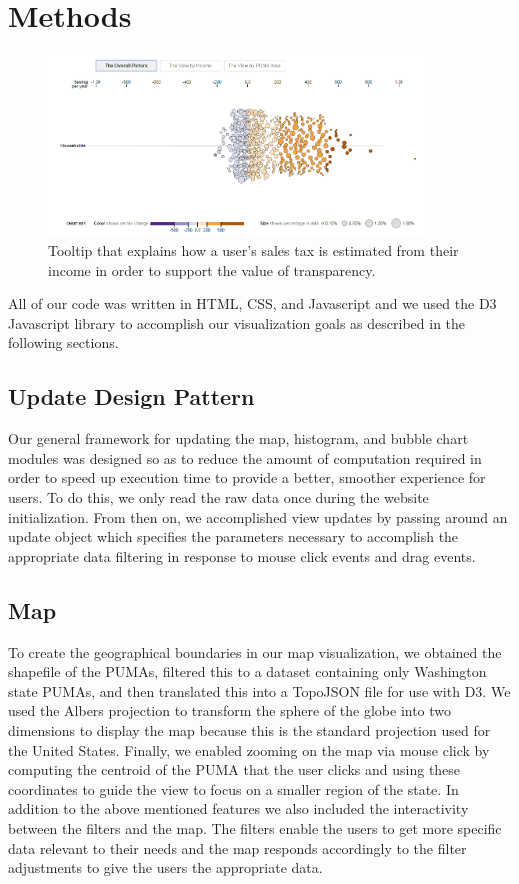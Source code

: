 \documentclass{sigchi}
\begin{document}
\section{Methods}
\begin{figure}[t]
\centering
\includegraphics[width=0.9\textwidth]{bubbleOverall}
\caption{Tooltip that explains how a user's sales tax is estimated from their income in order to support the value of transparency.}
\label{fig:bubbleOverall}
\end{figure}
All of our code was written in HTML, CSS, and Javascript and we used the D3 Javascript library to accomplish our visualization goals as described in the following sections. 

\subsection{Update Design Pattern}
Our general framework for updating the map, histogram, and bubble chart modules was designed so as to reduce the amount of computation required in order to speed up execution time to provide a better, smoother experience for users. To do this, we only read the raw data once during the website initialization. From then on, we accomplished view updates by passing around an update object which specifies the parameters necessary to accomplish the appropriate data filtering in response to mouse click events and drag events. 

\subsection{Map}
To create the geographical boundaries in our map visualization, we obtained the shapefile of the PUMAs, filtered this to a dataset containing only Washington state PUMAs, and then translated this into a TopoJSON file for use with D3. We used the Albers projection to transform the sphere of the globe into two dimensions to display the map because this is the standard projection used for the United States. Finally, we enabled zooming on the map via mouse click by computing the centroid of the PUMA that the user clicks and using these coordinates to guide the view to focus on a smaller region of the state. 
In addition to the above mentioned features we also included the interactivity between the filters and the map. The filters enable the users to get more specific data relevant to their needs and the map responds accordingly to the filter adjustments to give the users the appropriate data.
\end{document}
